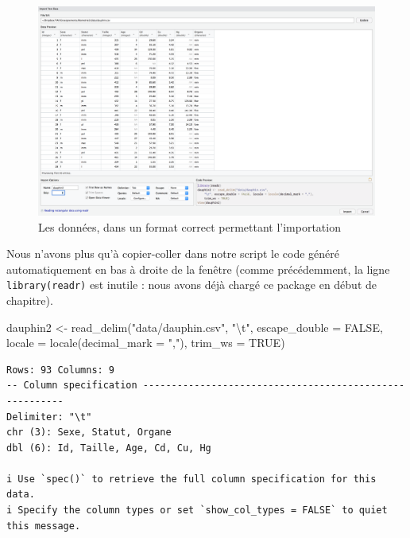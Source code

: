 \documentclass[
  a4paper,
  DIV=11,
  numbers=noendperiod,
  oneside]{scrreprt}
\newenvironment{Shaded}{}{}
\newcommand{\AttributeTok}[1]{\textcolor[rgb]{0.84,0.23,0.29}{#1}}
\newcommand{\ConstantTok}[1]{\textcolor[rgb]{0.00,0.36,0.77}{#1}}
\newcommand{\FunctionTok}[1]{\textcolor[rgb]{0.44,0.26,0.76}{#1}}
\newcommand{\NormalTok}[1]{\textcolor[rgb]{0.14,0.16,0.18}{#1}}
\newcommand{\OtherTok}[1]{\textcolor[rgb]{0.44,0.26,0.76}{#1}}
\newcommand{\SpecialCharTok}[1]{\textcolor[rgb]{0.00,0.36,0.77}{#1}}
\newcommand{\StringTok}[1]{\textcolor[rgb]{0.01,0.18,0.38}{#1}}
\begin{document}
\begin{figure}[H]

{\centering \includegraphics[width=1\textwidth,height=\textheight]{images/importcsv4.png}

}

\caption{Les données, dans un format correct permettant l'importation}

\end{figure}%

Nous n'avons plus qu'à copier-coller dans notre script le code généré
automatiquement en bas à droite de la fenêtre (comme précédemment, la
ligne \texttt{library(readr)} est inutile : nous avons déjà chargé ce
package en début de chapitre).

\begin{Shaded}
\begin{Highlighting}[]
\NormalTok{dauphin2 }\OtherTok{\textless{}{-}} \FunctionTok{read\_delim}\NormalTok{(}\StringTok{"data/dauphin.csv"}\NormalTok{, }
    \StringTok{"}\SpecialCharTok{\textbackslash{}t}\StringTok{"}\NormalTok{, }\AttributeTok{escape\_double =} \ConstantTok{FALSE}\NormalTok{, }\AttributeTok{locale =} \FunctionTok{locale}\NormalTok{(}\AttributeTok{decimal\_mark =} \StringTok{","}\NormalTok{), }
    \AttributeTok{trim\_ws =} \ConstantTok{TRUE}\NormalTok{)}
\end{Highlighting}
\end{Shaded}

\begin{verbatim}
Rows: 93 Columns: 9
-- Column specification --------------------------------------------------------
Delimiter: "\t"
chr (3): Sexe, Statut, Organe
dbl (6): Id, Taille, Age, Cd, Cu, Hg

i Use `spec()` to retrieve the full column specification for this data.
i Specify the column types or set `show_col_types = FALSE` to quiet this message.
\end{verbatim}
\end{document}
